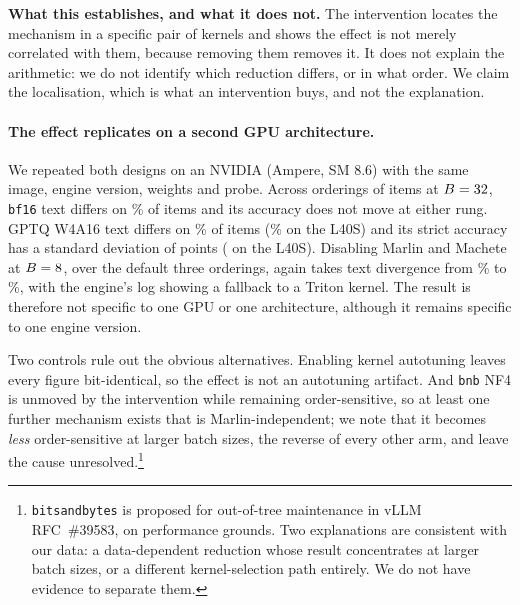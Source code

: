\documentclass[conference]{IEEEtran}
\begin{document}
\textbf{What this establishes, and what it does not.} The intervention locates the
mechanism in a specific pair of kernels and shows the effect is not merely correlated with
them, because removing them removes it. It does not explain the arithmetic: we do not
identify which reduction differs, or in what order. We claim the localisation, which is what
an intervention buys, and not the explanation.

\paragraph{The effect replicates on a second GPU architecture.}
We repeated both designs on an NVIDIA \hEightSpotGPU{} (Ampere, SM 8.6) with the same
image, engine version, weights and probe. Across \hEightSpotOrderings{} orderings of
\hEightSpotItems{} items at $B=32$, \texttt{bf16} text differs on
\hEightSpotBFText\% of items and its accuracy does not move at either rung. GPTQ W4A16
text differs on \hEightSpotText\% of items (\hEightTenText\% on the L40S) and its
strict accuracy has a standard deviation of \hEightSpotSD{} points (\hEightTenSD{} on the
L40S). Disabling Marlin and Machete at $B=8$, over the default three
orderings, again takes text divergence from \hEightSpotMarlinOn\% to
\hEightSpotMarlinOff\%, with the engine's log showing a fallback to a Triton kernel. The result is therefore not specific to one GPU or one architecture,
although it remains specific to one engine version.

\begin{table}[t]
\centering
\caption{Paired intervention at $B=8$: identical inputs, identical engine, with
and without the Marlin and Machete kernels. Text divergence and accuracy SD in
percentage points. bitsandbytes NF4 is unaffected at exactly $1.00\times$
because it never used these kernels, so its ordering sensitivity has a second and distinct
cause.}
\label{tab:h8-mechanism}
\small

\end{table}

Two controls rule out the obvious alternatives. Enabling kernel autotuning
leaves every figure bit-identical, so the effect is not an autotuning artifact.
And \texttt{bnb} NF4 is unmoved by the intervention while remaining
order-sensitive, so at least one further mechanism exists that is
Marlin-independent; we note that it becomes \emph{less} order-sensitive at
larger batch sizes, the reverse of every other arm, and leave the cause
unresolved.\footnote{\texttt{bitsandbytes} is proposed for out-of-tree
maintenance in vLLM RFC~\#39583, on performance grounds. Two explanations are
consistent with our data: a data-dependent reduction whose result
concentrates at larger batch sizes, or a different kernel-selection path
entirely. We do not have evidence to separate them.}
\end{document}
